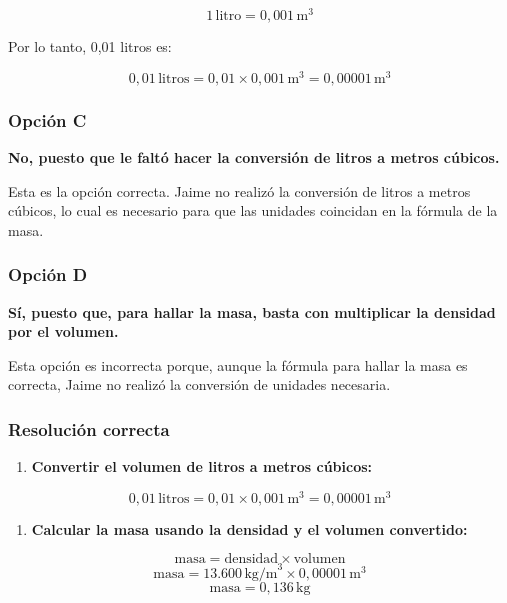 \documentclass[
]{article}
\providecommand{\tightlist}{%
  \setlength{\itemsep}{0pt}\setlength{\parskip}{0pt}}
\begin{document}
\[ 1 \, \text{litro} = 0,001 \, \text{m}^3 \]

Por lo tanto, 0,01 litros es:

\[ 0,01 \, \text{litros} = 0,01 \times 0,001 \, \text{m}^3 = 0,00001 \, \text{m}^3 \]

\subsubsection{Opción C}\label{opciuxf3n-c}

\textbf{No, puesto que le faltó hacer la conversión de litros a metros
cúbicos.}

Esta es la opción correcta. Jaime no realizó la conversión de litros a
metros cúbicos, lo cual es necesario para que las unidades coincidan en
la fórmula de la masa.

\subsubsection{Opción D}\label{opciuxf3n-d}

\textbf{Sí, puesto que, para hallar la masa, basta con multiplicar la
densidad por el volumen.}

Esta opción es incorrecta porque, aunque la fórmula para hallar la masa
es correcta, Jaime no realizó la conversión de unidades necesaria.

\subsubsection{Resolución correcta}\label{resoluciuxf3n-correcta}

\begin{enumerate}
\def\labelenumi{\arabic{enumi}.}
\tightlist
\item
  \textbf{Convertir el volumen de litros a metros cúbicos:}
\end{enumerate}

\[ 0,01 \, \text{litros} = 0,01 \times 0,001 \, \text{m}^3 = 0,00001 \, \text{m}^3 \]

\begin{enumerate}
\def\labelenumi{\arabic{enumi}.}
\setcounter{enumi}{1}
\tightlist
\item
  \textbf{Calcular la masa usando la densidad y el volumen convertido:}
\end{enumerate}

\[ \text{masa} = \text{densidad} \times \text{volumen} \]
\[ \text{masa} = 13.600 \, \text{kg/m}^3 \times 0,00001 \, \text{m}^3 \]
\[ \text{masa} = 0,136 \, \text{kg} \]
\end{document}
